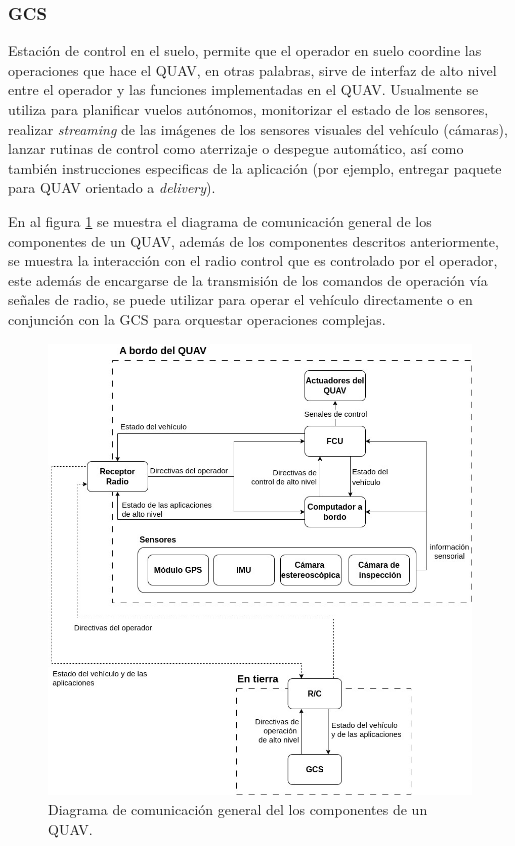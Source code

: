 \subsubsection{GCS}

Estación de control en el suelo, permite que el operador en suelo coordine las operaciones que hace el QUAV, en otras palabras, sirve de interfaz de alto nivel entre el operador y las funciones implementadas en el QUAV. Usualmente se utiliza para planificar vuelos autónomos, monitorizar el estado de los sensores, realizar \textit{streaming} de las imágenes de los sensores visuales del vehículo (cámaras), lanzar rutinas de control como aterrizaje o despegue automático, así como también instrucciones especificas de la aplicación (por ejemplo, entregar paquete para QUAV orientado a \textit{delivery}).

En al figura \ref{fig:QUAV-components} se muestra el diagrama de comunicación general de los componentes de un QUAV, además de los componentes descritos anteriormente, se muestra la interacción con el radio control que es controlado por el operador, este además de encargarse de la transmisión de los comandos de operación vía señales de radio, se puede utilizar para operar el vehículo directamente o en conjunción con la GCS para orquestar operaciones complejas. 

\begin{figure}[H]
    \centering
    \includegraphics[scale=0.45]{partes/img/QUAV-components.jpg}
    \caption[Diagrama de comunicación general del los componentes de un QUAV.]{Diagrama de comunicación general del los componentes de un QUAV.} 
    \label{fig:QUAV-components}
\end{figure}

